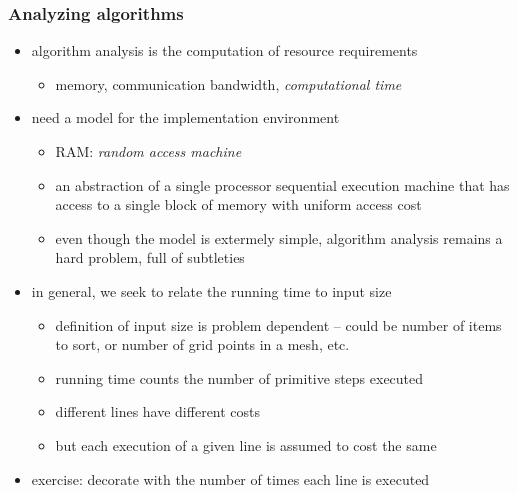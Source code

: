 \begin{frame}[fragile]
%
  \frametitle{Analyzing algorithms}
%
  \begin{itemize}
%
  \item algorithm analysis is the computation of resource requirements
    \begin{itemize}
      \item memory, communication bandwidth, {\em computational time}
    \end{itemize}
%
  \item need a model for the implementation environment
    \begin{itemize}
      \item RAM: {\em random access machine}
      \item an abstraction of a single processor sequential execution machine that has access
        to a single block of memory with uniform access cost
      \item even though the model is extermely simple, algorithm analysis remains a hard
        problem, full of subtleties
    \end{itemize}
%
    \item in general, we seek to relate the running time to input size
      \begin{itemize}
        \item definition of input size is problem dependent -- could be number of items to sort,
          or number of grid points in a mesh, etc.
        \item running time counts the number of primitive steps executed
        \item different lines have different costs
        \item but each execution of a given line is assumed to cost the same
      \end{itemize}
%
    \item exercise: decorate  with the number of times each line is
      executed
%
  \end{itemize}
%
\end{frame}

